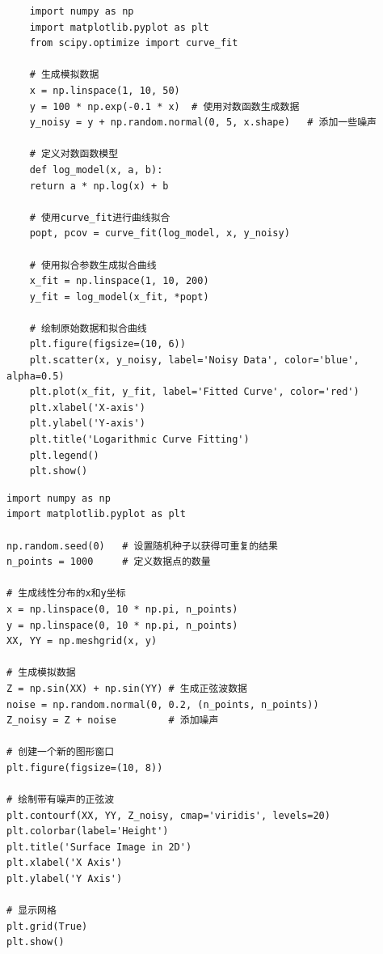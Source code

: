 \documentclass[zihao=-4]{ctexart}
\begin{document}
\clearpage
{}
\begin{lstlisting}
	import numpy as np
	import matplotlib.pyplot as plt
	from scipy.optimize import curve_fit
	
	# 生成模拟数据
	x = np.linspace(1, 10, 50)
	y = 100 * np.exp(-0.1 * x)  # 使用对数函数生成数据
	y_noisy = y + np.random.normal(0, 5, x.shape)	# 添加一些噪声
	
	# 定义对数函数模型
	def log_model(x, a, b):
	return a * np.log(x) + b
	
	# 使用curve_fit进行曲线拟合
	popt, pcov = curve_fit(log_model, x, y_noisy)
	
	# 使用拟合参数生成拟合曲线
	x_fit = np.linspace(1, 10, 200)
	y_fit = log_model(x_fit, *popt)
	
	# 绘制原始数据和拟合曲线
	plt.figure(figsize=(10, 6))
	plt.scatter(x, y_noisy, label='Noisy Data', color='blue', alpha=0.5)
	plt.plot(x_fit, y_fit, label='Fitted Curve', color='red')
	plt.xlabel('X-axis')
	plt.ylabel('Y-axis')
	plt.title('Logarithmic Curve Fitting')
	plt.legend()
	plt.show()
\end{lstlisting}

\clearpage
{}
\begin{lstlisting}
import numpy as np
import matplotlib.pyplot as plt

np.random.seed(0)	# 设置随机种子以获得可重复的结果
n_points = 1000		# 定义数据点的数量

# 生成线性分布的x和y坐标
x = np.linspace(0, 10 * np.pi, n_points)
y = np.linspace(0, 10 * np.pi, n_points)
XX, YY = np.meshgrid(x, y)

# 生成模拟数据
Z = np.sin(XX) + np.sin(YY)	# 生成正弦波数据
noise = np.random.normal(0, 0.2, (n_points, n_points))
Z_noisy = Z + noise			# 添加噪声

# 创建一个新的图形窗口
plt.figure(figsize=(10, 8))

# 绘制带有噪声的正弦波
plt.contourf(XX, YY, Z_noisy, cmap='viridis', levels=20)
plt.colorbar(label='Height')
plt.title('Surface Image in 2D')
plt.xlabel('X Axis')
plt.ylabel('Y Axis')

# 显示网格
plt.grid(True)
plt.show()
\end{lstlisting}
\end{document}
